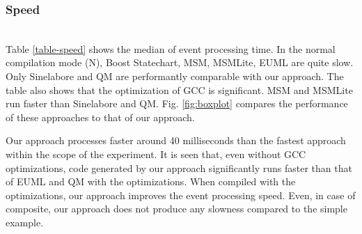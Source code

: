 \subsubsection{Speed} ~\\
\noindent
Table \ref{table-speed} shows the median of event processing time. 
In the normal compilation mode (N), Boost Statechart, MSM, MSMLite, EUML are quite slow. 
Only Sinelabore and QM are performantly comparable with our approach. 
The table also shows that the optimization of GCC is significant. 
MSM and MSMLite run faster than Sinelabore and QM.   
Fig. \ref{fig:boxplot} compares the performance of these approaches to that of our approach.

Our approach processes faster around 40 milliseconds than the fastest approach within the scope of the experiment.
It is seen that, even without GCC optimizations, code generated by our approach significantly runs faster than that of EUML and QM with the optimizations. 
When compiled with the optimizations, our approach improves the event processing speed. 
Even, in case of composite, our approach does not produce any slowness compared to the simple example. 

